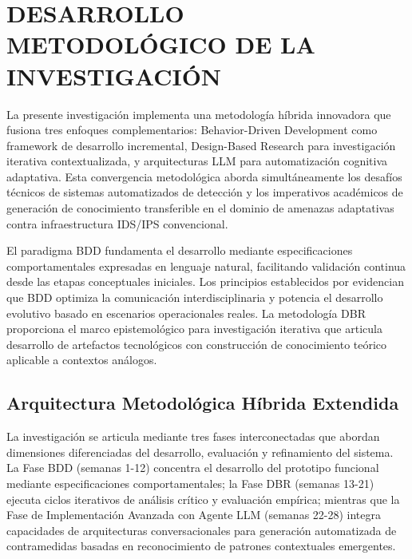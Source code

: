 \chapter{DESARROLLO METODOLÓGICO DE LA INVESTIGACIÓN}

La presente investigación implementa una metodología híbrida innovadora que fusiona tres enfoques complementarios: Behavior-Driven Development como framework de desarrollo incremental, Design-Based Research para investigación iterativa contextualizada, y arquitecturas LLM para automatización cognitiva adaptativa. Esta convergencia metodológica aborda simultáneamente los desafíos técnicos de sistemas automatizados de detección y los imperativos académicos de generación de conocimiento transferible en el dominio de amenazas adaptativas contra infraestructura IDS/IPS convencional.

El paradigma BDD fundamenta el desarrollo mediante especificaciones comportamentales expresadas en lenguaje natural, facilitando validación continua desde las etapas conceptuales iniciales. Los principios establecidos por \cite{North2006BDD} evidencian que BDD optimiza la comunicación interdisciplinaria y potencia el desarrollo evolutivo basado en escenarios operacionales reales. La metodología DBR proporciona el marco epistemológico para investigación iterativa que articula desarrollo de artefactos tecnológicos con construcción de conocimiento teórico aplicable a contextos análogos.

\section{Arquitectura Metodológica Híbrida Extendida}
\FloatBarrier

La investigación se articula mediante tres fases interconectadas que abordan dimensiones diferenciadas del desarrollo, evaluación y refinamiento del sistema. La Fase BDD (semanas 1-12) concentra el desarrollo del prototipo funcional mediante especificaciones comportamentales; la Fase DBR (semanas 13-21) ejecuta ciclos iterativos de análisis crítico y evaluación empírica; mientras que la Fase de Implementación Avanzada con Agente LLM (semanas 22-28) integra capacidades de arquitecturas conversacionales para generación automatizada de contramedidas basadas en reconocimiento de patrones contextuales emergentes.


